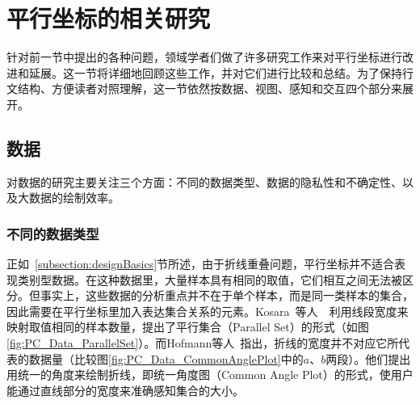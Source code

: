 \documentclass[12pt,twocolumn]{article}
\begin{document}
\section{平行坐标的相关研究}
\label{section:impro}

针对前一节中提出的各种问题，领域学者们做了许多研究工作来对平行坐标进行改进和延展。这一节将详细地回顾这些工作，并对它们进行比较和总结。为了保持行文结构、方便读者对照理解，这一节依然按数据、视图、感知和交互四个部分来展开。

\subsection{数据}
\label{subsection:dataImpro}

对数据的研究主要关注三个方面：不同的数据类型、数据的隐私性和不确定性、以及大数据的绘制效率。

\subsubsection{不同的数据类型}

正如~\ref{subsection:designBasics}节所述，由于折线重叠问题，平行坐标并不适合表现类别型数据。在这种数据里，大量样本具有相同的取值，它们相互之间无法被区分。但事实上，这些数据的分析重点并不在于单个样本，而是同一类样本的集合，因此需要在平行坐标里加入表达集合关系的元素。Kosara~等人~\citep{kosara2006parallel}~\citep{bendix2005parallel}利用线段宽度来映射取值相同的样本数量，提出了平行集合（Parallel Set）的形式（如图\ref{fig:PC_Data_ParallelSet}）。而Hofmann等人~\citep{hofmann2013common}指出，折线的宽度并不对应它所代表的数据量（比较图\ref{fig:PC_Data_CommonAnglePlot}中的$a$、$b$两段）。他们提出用统一的角度来绘制折线，即统一角度图（Common Angle Plot）的形式，使用户能通过直线部分的宽度来准确感知集合的大小。
\end{document}
